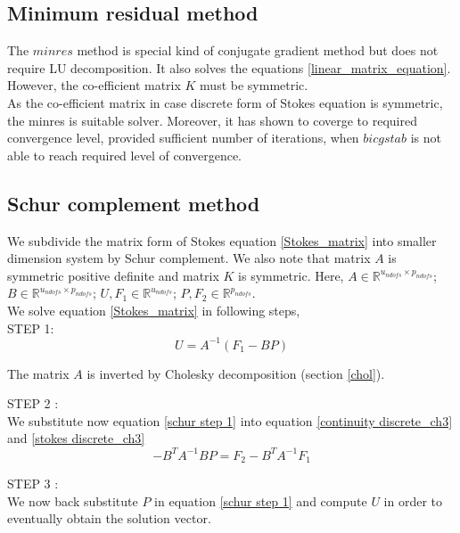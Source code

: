 \documentclass[a4paper]{book}
\begin{document}
\subsection{Minimum residual method} 

The $minres$ method is special kind of conjugate gradient method but does not require LU decomposition. It also solves the equations \ref{linear_matrix_equation}. However, the co-efficient matrix $K$ must be symmetric. \\

As the co-efficient matrix in case discrete form of Stokes equation is symmetric, the minres is suitable solver. Moreover, it has shown to coverge to required convergence level, provided sufficient number of iterations, when $bicgstab$ is not able to reach required level of convergence.

\subsection{Schur complement method} \label{schur}

We subdivide the matrix form of Stokes equation \eqref{Stokes_matrix} into smaller dimension system by Schur complement. We also note that matrix $A$ is symmetric positive definite and matrix $K$ is symmetric.
Here, $A \in \mathbb{R}^{u_{ndofs} \times p_{ndofs}}$; $B \in \mathbb{R}^{u_{ndofs} \times p_{ndofs}}$; $U,F_1 \in \mathbb{R}^{u_{ndofs}}$; $P, F_2 \in \mathbb{R}^{p_{ndofs}}$. \\

We solve equation \eqref{Stokes_matrix} in following steps,\\

STEP 1: \\ 
\begin{equation}\label{schur step 1}
U = A^{-1}(F_1 - BP) 
\end{equation}

The matrix $A$ is inverted by Cholesky decomposition (section \ref{chol}). 

STEP 2 : \\
We substitute now equation \eqref{schur step 1} into equation \eqref{continuity discrete_ch3} and \eqref{stokes discrete_ch3}
\begin{equation}\label{schur step 2}
- B^T A^{-1} B P = F_2 - B^T A^{-1} F_1
\end{equation}

STEP 3 : \\
We now back substitute $P$ in equation \eqref{schur step 1} and compute $U$ in order to eventually obtain the solution vector.
\\
\end{document}
